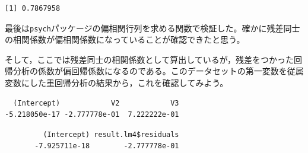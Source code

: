 \documentclass[
  a4paper,
]{ltjsbook}
\newenvironment{Shaded}{\begin{snugshade}}{\end{snugshade}}
\newcommand{\AttributeTok}[1]{\textcolor[rgb]{0.40,0.45,0.13}{#1}}
\newcommand{\CommentTok}[1]{\textcolor[rgb]{0.37,0.37,0.37}{#1}}
\newcommand{\FunctionTok}[1]{\textcolor[rgb]{0.28,0.35,0.67}{#1}}
\newcommand{\NormalTok}[1]{\textcolor[rgb]{0.00,0.23,0.31}{#1}}
\newcommand{\OtherTok}[1]{\textcolor[rgb]{0.00,0.23,0.31}{#1}}
\newcommand{\SpecialCharTok}[1]{\textcolor[rgb]{0.37,0.37,0.37}{#1}}
\begin{document}
\begin{verbatim}
[1] 0.7867958
\end{verbatim}

最後は\texttt{psych}パッケージの偏相関行列を求める関数で検証した。確かに残差同士の相関係数が偏相関係数になっていることが確認できたと思う。

そして，ここでは残差同士の相関係数として算出しているが，残差をつかった回帰分析の係数が偏回帰係数になるのである。このデータセットの第一変数を従属変数にした重回帰分析の結果から，これを確認してみよう。

\begin{Shaded}
\end{Shaded}

\begin{verbatim}
  (Intercept)            V2            V3 
-5.218050e-17 -2.777778e-01  7.222222e-01 
\end{verbatim}

\begin{Shaded}
\end{Shaded}

\begin{verbatim}
         (Intercept) result.lm4$residuals 
       -7.925711e-18        -2.777778e-01 
\end{verbatim}
\end{document}
